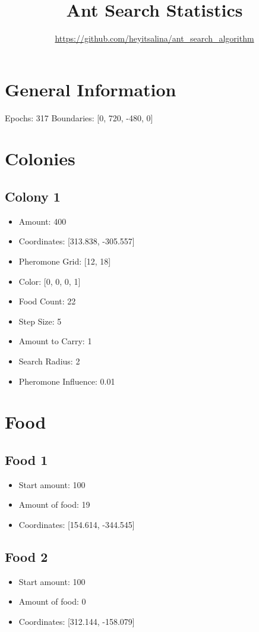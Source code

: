\documentclass{article}
\begin{document}
    \title{Ant Search Statistics}
    \author{\url{https://github.com/heyitsalina/ant_search_algorithm}}
    \maketitle

    \section{General Information}

    Epochs: 317\newline
Boundaries: [0, 720, -480, 0]


    \section{Colonies}

    \subsection*{Colony 1}
\begin{itemize}
\item Amount: 400
\item Coordinates: [313.838, -305.557]
\item Pheromone Grid: [12, 18]
\item Color: [0, 0, 0, 1]
\item Food Count: 22
\item Step Size: 5
\item Amount to Carry: 1
\item Search Radius: 2
\item Pheromone Influence: 0.01
\end{itemize}


    \section{Food}

    \subsection*{Food 1}
\begin{itemize}
\item Start amount: 100
\item Amount of food: 19
\item Coordinates: [154.614, -344.545]
\end{itemize}
\subsection*{Food 2}
\begin{itemize}
\item Start amount: 100
\item Amount of food: 0
\item Coordinates: [312.144, -158.079]
\end{itemize}
\end{document}
